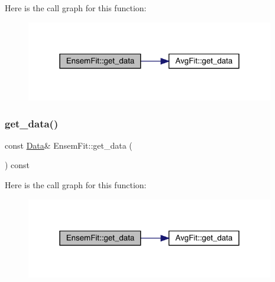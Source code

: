 Here is the call graph for this function\+:
\nopagebreak
\begin{figure}[H]
\begin{center}
\leavevmode
\includegraphics[width=307pt]{dc/dae/classEnsemFit_a3015ab1126ad56869931c3ee6e5f054f_cgraph}
\end{center}
\end{figure}
\mbox{\label{classEnsemFit_a3015ab1126ad56869931c3ee6e5f054f}} 
\subsubsection{\texorpdfstring{get\_data()}{get\_data()}\hspace{0.1cm}{\footnotesize\ttfamily [2/2]}}
{\footnotesize\ttfamily const \mbox{\hyperlink{classData}{Data}}\& Ensem\+Fit\+::get\+\_\+data (\begin{DoxyParamCaption}{ }\end{DoxyParamCaption}) const\hspace{0.3cm}{\ttfamily [inline]}}

Here is the call graph for this function\+:
\nopagebreak
\begin{figure}[H]
\begin{center}
\leavevmode
\includegraphics[width=307pt]{dc/dae/classEnsemFit_a3015ab1126ad56869931c3ee6e5f054f_cgraph}
\end{center}
\end{figure}
\mbox{\label{classEnsemFit_afa01cceaae9172656f561cdd2d63121b}} 
